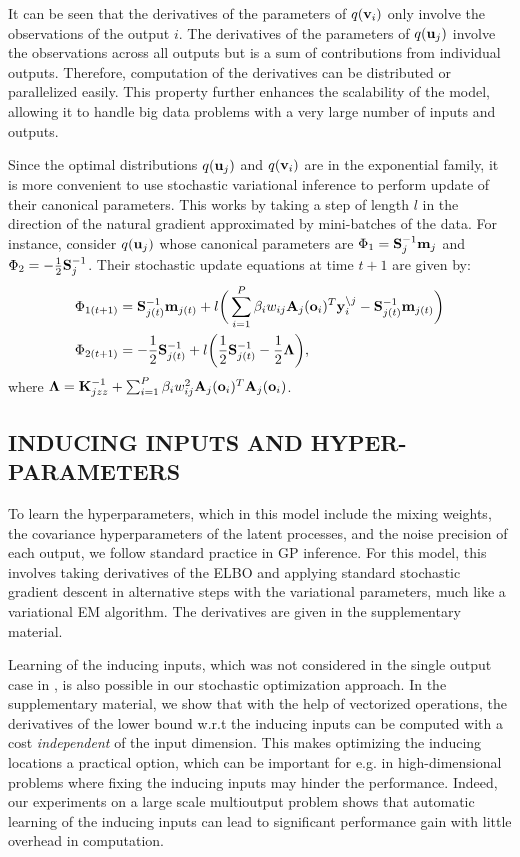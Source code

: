 \noindent It can be seen that the derivatives of the parameters of $q(\v_i)$ only involve the observations of the output $i$.
The derivatives of the parameters of $q(\u_j)$ involve the observations across all outputs but is a sum of contributions from individual outputs.
Therefore, computation of the derivatives can be distributed or parallelized easily.
This property further enhances the scalability of the model, allowing it to handle big data problems with a very large number of inputs and outputs.

Since the optimal distributions $q(\u_j)$ and $q(\v_i)$ are in the exponential family, it is more convenient to use stochastic variational inference \citep{hensman2012fast,hensmangaussian} to perform update of their canonical parameters.
This works by taking a step of length $l$ in the direction of the natural gradient approximated by mini-batches of the data.
For instance, consider $q(\u_j)$ whose canonical parameters are $\Phi_1 = \S_j^{-1} \m_j$ and $\Phi_2 = -\frac{1}{2}\S_j^{-1}$.
Their stochastic update equations at time $t + 1$ are given by:
\begin{align}
\Phi_{1(t+1)} &= \S_{j(t)}^{-1} \m_{j(t)} + l \bigg(\sum_{i=1}^P \beta_i w_{ij} \A_j(\oi)^T \ynoj - \S_{j(t)}^{-1} \m_{j(t)} \bigg) \\
\Phi_{2(t+1)} &= -\frac{1}{2} \S_{j(t)}^{-1} + l \bigg(\frac{1}{2} \S_{j(t)}^{-1} - \frac{1}{2} \mat{\Lambda} \bigg),
\end{align}
\normalsize
where $\mat{\Lambda} = \Kjzz^{-1} + \sum_{i=1}^P \beta_i w_{ij}^2 \A_j(\oi)^T \A_j(\oi)$.

\subsection{INDUCING INPUTS AND HYPER-PARAMETERS \label{sec:hyperparameters}}
To learn the hyperparameters, which in this model include the mixing weights, the covariance hyperparameters of the latent processes, and the noise precision of each output, we follow standard practice in GP inference.
For this model, this involves taking derivatives of the ELBO and applying standard stochastic gradient descent in alternative steps with the variational parameters, much like a variational EM algorithm. 
The derivatives are given in the supplementary material.

Learning of the inducing inputs, which was not considered in the single output case in \citep{hensmangaussian}, is also possible in our stochastic optimization approach.
In the supplementary material, we show that with the help of vectorized operations, the derivatives of the lower bound w.r.t the inducing inputs can be computed with a cost \emph{independent} of the input dimension.
This makes optimizing the inducing locations a practical option, which can be important for e.g. in high-dimensional problems where fixing the inducing inputs may hinder the performance.
Indeed, our experiments on a large scale multioutput problem shows that automatic learning of the inducing inputs can lead to significant performance gain with little overhead in computation. 

